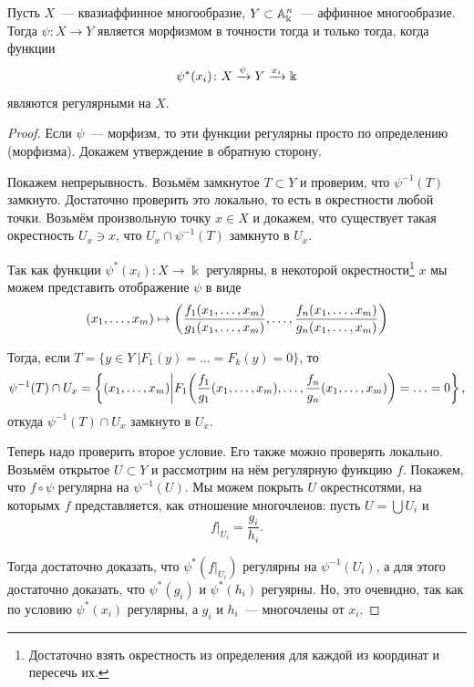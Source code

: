 	\begin{statement}\label{morph_criterion} 
	    	Пусть $X$~--- квазиаффинное многообразие, $Y \subset \AA^n_{\Bbbk}$~--- аффинное многообразие. Тогда $\psi\colon X \to Y$ является морфизмом в точности тогда и только тогда, когда функции
	    	\[
	    		\psi^*(x_i) \colon X \xrightarrow{\psi} Y \xrightarrow{x_i} \bk
	    	\]
	    	являются регулярными на $X$.

	    \end{statement}
	    \begin{proof}
	    	Если $\psi$~--- морфизм, то эти функции регулярны просто по определению (морфизма). Докажем утверждение в обратную сторону. 

	    	Покажем непрерывность. Возьмём замкнутое $T \subset Y$ и проверим, что $\psi^{-1}(T)$ замкнуто. Достаточно проверить это локально, то есть в окрестности любой точки. Возьмём произвольную точку $x \in X$ и докажем, что существует такая окрестность $U_x \ni x$, что $U_x \cap \psi^{-1}(T)$ замкнуто в $U_x$.  

	    	Так как функции $\psi^*(x_i)\colon X \to \Bbbk$ регулярны, в некоторой окрестности\footnote{Достаточно взять окрестность из определения для каждой из координат и пересечь их. } $x$ мы можем представить отображение $\psi$ в виде 
	    	\[
	    		(x_1, \ldots, x_m) \mapsto \lr*{\frac{f_1(x_1, \ldots, x_m)}{g_1(x_1, \ldots, x_m)}, \ldots, \frac{f_n(x_1, \ldots, x_m)}{g_n(x_1, \ldots, x_m)}}
	    	\]
	    	
	    	Тогда, если  $T = \{ y \in Y \ \vert F_1(y) = \ldots = F_k(y) = 0 \}$, то 
	    	\[
	    		\psi^{-1}(T) \cap U_x = \left\{ (x_1, \ldots, x_m) \bigg\vert F_1\lr*{\frac{f_1}{g_1}(x_1, \ldots, x_m), \ldots, \frac{f_n}{g_n}(x_1, \ldots, x_m) }  =  \ldots = 0 \right\},
	    	\]
	    	откуда $\psi^{-1}(T) \cap U_x$ замкнуто в $U_x$. 

	    	Теперь надо проверить второе условие. Его также можно проверять локально. Возьмём открытое $U \subset Y$ и рассмотрим на нём регулярную функцию $f$. Покажем, что $f \circ \psi$ регулярна на $\psi^{-1}(U)$. Мы можем покрыть $U$ окрестнсотями, на которымх $f$ представляется, как отношение многочленов: пусть $U = \bigcup U_i$ и 
	    	\[
	    		f\vert_{U_i} = \frac{g_i}{h_i}.
	    	\]

	    	Тогда достаточно доказать, что $\psi^*(f\vert_{U_i})$ регулярны на $\psi^{-1}(U_i)$, а для этого достаточно доказать, что $\psi^*(g_i)$ и $\psi^*(h_i)$ регуярны. Но, это очевидно, так как по условию $\psi^{*}(x_i)$ регулярны, а $g_i$ и $h_i$~--- многочлены от $x_i$. 
	    \end{proof}

